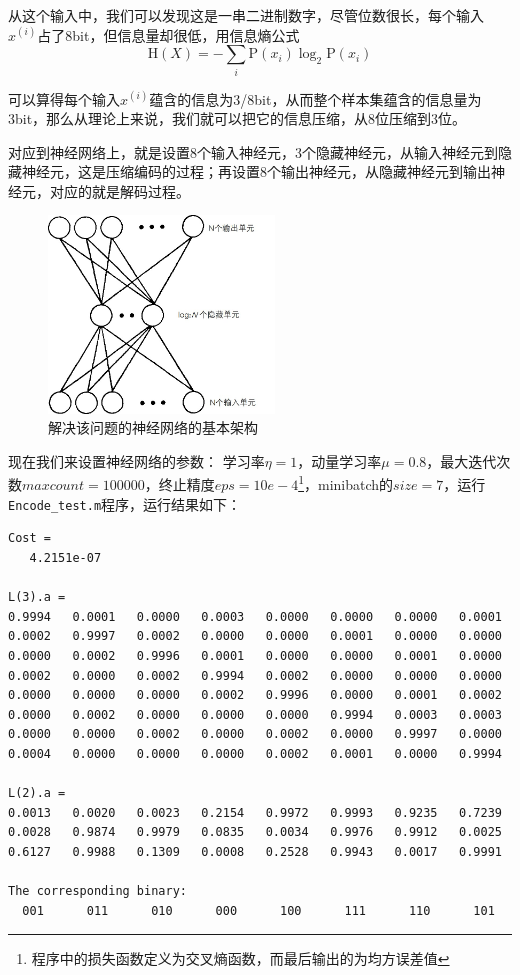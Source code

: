 从这个输入中，我们可以发现这是一串二进制数字，尽管位数很长，每个输入$x^{(i)}$占了8bit，但信息量却很低，用信息熵公式
\[\mathrm{H} (X)=-\sum _{{i}}{{\mathrm  {P}}(x_{i})\log _{2}{\mathrm  {P}}(x_{i})}\]

可以算得每个输入$x^{(i)}$蕴含的信息为3/8bit，从而整个样本集蕴含的信息量为3bit，那么从理论上来说，我们就可以把它的信息压缩，从8位压缩到3位。

对应到神经网络上，就是设置8个输入神经元，3个隐藏神经元，从输入神经元到隐藏神经元，这是压缩编码的过程；再设置8个输出神经元，从隐藏神经元到输出神经元，对应的就是解码过程。

\begin{figure}[H]
\centering
\includegraphics[width=6cm]{fig/s2.png}
\caption{解决该问题的神经网络的基本架构}
\end{figure}

现在我们来设置神经网络的参数：
学习率$\eta=1$，动量学习率$\mu=0.8$，最大迭代次数$maxcount=100000$，终止精度$eps=10e-4$\footnote{程序中的损失函数定义为交叉熵函数，而最后输出的为均方误差值}，minibatch的$size=7$，运行\verb|Encode_test.m|程序，运行结果如下：

\small
\begin{verbatim}
Cost =
   4.2151e-07
   
L(3).a =
0.9994   0.0001   0.0000   0.0003   0.0000   0.0000   0.0000   0.0001
0.0002   0.9997   0.0002   0.0000   0.0000   0.0001   0.0000   0.0000
0.0000   0.0002   0.9996   0.0001   0.0000   0.0000   0.0001   0.0000
0.0002   0.0000   0.0002   0.9994   0.0002   0.0000   0.0000   0.0000
0.0000   0.0000   0.0000   0.0002   0.9996   0.0000   0.0001   0.0002
0.0000   0.0002   0.0000   0.0000   0.0000   0.9994   0.0003   0.0003
0.0000   0.0000   0.0002   0.0000   0.0002   0.0000   0.9997   0.0000
0.0004   0.0000   0.0000   0.0000   0.0002   0.0001   0.0000   0.9994

L(2).a =
0.0013   0.0020   0.0023   0.2154   0.9972   0.9993   0.9235   0.7239
0.0028   0.9874   0.9979   0.0835   0.0034   0.9976   0.9912   0.0025
0.6127   0.9988   0.1309   0.0008   0.2528   0.9943   0.0017   0.9991

The corresponding binary:
  001      011      010      000      100      111      110      101
\end{verbatim}
\normalsize

